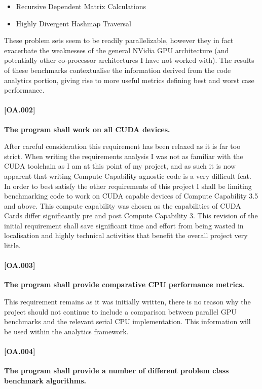 \begin{itemize}
\item Recursive Dependent Matrix Calculations
\item Highly Divergent Hashmap Traversal
\end{itemize}

These problem sets seem to be readily parallelizable, however they in fact exacerbate the weaknesses of the general NVidia GPU architecture (and potentially other co-processor architectures I have not worked with). The results of these benchmarks contextualise the information derived from the code analytics portion, giving rise to more useful metrics defining best and worst case performance.

\paragraph{[OA.002]}
\textbf{The program shall work on all CUDA devices.}

After careful consideration this requirement has been relaxed as it is far too strict. When writing the requirements analysis I was not as familiar with the CUDA toolchain as I am at this point of my project, and as such it is now apparent that writing Compute Capability agnostic code is a very difficult feat. In order to best satisfy the other requirements of this project I shall be limiting benchmarking code to work on CUDA capable devices of Compute Capability 3.5 and above. This compute capability was chosen as the capabilities of CUDA Cards differ significantly pre and post Compute Capability 3. This revision of the initial requirement shall save significant time and effort from being wasted in localisation and highly technical activities that benefit the overall project very little.

\paragraph{[OA.003]}
\textbf{The program shall provide comparative CPU performance metrics.}

This requirement remains as it was initially written, there is no reason why the project should not continue to include a comparison between parallel GPU benchmarks and the relevant serial CPU implementation. This information will be used within the analytics framework.

\paragraph{[OA.004]}
\textbf{The program shall provide a number of different problem class
benchmark algorithms.}

